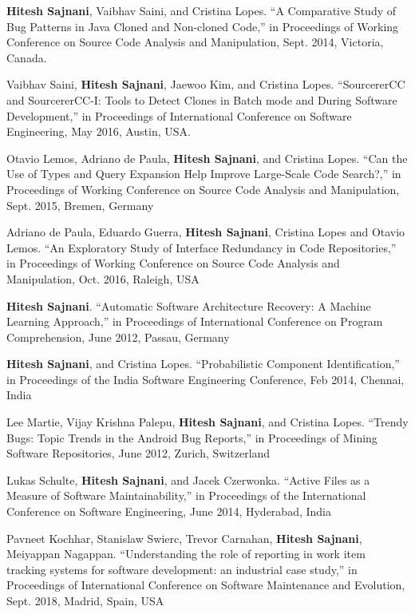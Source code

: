 \documentclass[a4paper]{article}
\begin{document}
\begin{small}
\begin{thebibliography}{}
\textbf{Hitesh Sajnani}, Vaibhav Saini, and Cristina Lopes. “A Comparative Study of Bug
Patterns in Java Cloned and Non-cloned Code,” in Proceedings of Working Conference
on Source Code Analysis and Manipulation, Sept. 2014, Victoria, Canada.

Vaibhav Saini, \textbf{Hitesh Sajnani}, Jaewoo Kim, and Cristina Lopes. “SourcererCC and
SourcererCC-I: Tools to Detect Clones in Batch mode and During Software Development,”
in Proceedings of International Conference on Software Engineering, May 2016,
Austin, USA.

Otavio Lemos, Adriano de Paula, \textbf{Hitesh Sajnani}, and Cristina Lopes. “Can the Use of Types
and Query Expansion Help Improve Large-Scale Code Search?,” in Proceedings of
Working Conference on Source Code Analysis and Manipulation, Sept. 2015, Bremen,
Germany 

Adriano de Paula, Eduardo Guerra, \textbf{Hitesh Sajnani}, Cristina Lopes and Otavio Lemos. “An Exploratory Study of Interface Redundancy in Code Repositories,” in Proceedings of Working Conference on Source Code Analysis and Manipulation, Oct. 2016, Raleigh, USA

\textbf{Hitesh Sajnani}. “Automatic Software Architecture Recovery: A Machine Learning
Approach,” in Proceedings of International Conference on Program Comprehension, June
2012, Passau, Germany

\textbf{Hitesh Sajnani}, and Cristina Lopes. “Probabilistic Component Identification,” in Proceedings
of the India Software Engineering Conference, Feb 2014, Chennai, India 

Lee Martie, Vijay Krishna Palepu, \textbf{Hitesh Sajnani}, and Cristina Lopes. “Trendy Bugs: Topic
Trends in the Android Bug Reports,” in Proceedings of Mining Software Repositories,
June 2012, Zurich, Switzerland

Lukas Schulte, \textbf{Hitesh Sajnani}, and Jacek Czerwonka. “Active Files as a Measure of
Software Maintainability,” in Proceedings of the International Conference on Software
Engineering, June 2014, Hyderabad, India 

Pavneet Kochhar, Stanislaw Swierc, Trevor Carnahan, \textbf{Hitesh Sajnani}, Meiyappan Nagappan. “Understanding the role of reporting in work item tracking systems for software development: an industrial case study,” in Proceedings of International Conference on Software Maintenance and Evolution, Sept. 2018, Madrid, Spain, USA 


\end{thebibliography}
\end{small}
\end{document}
